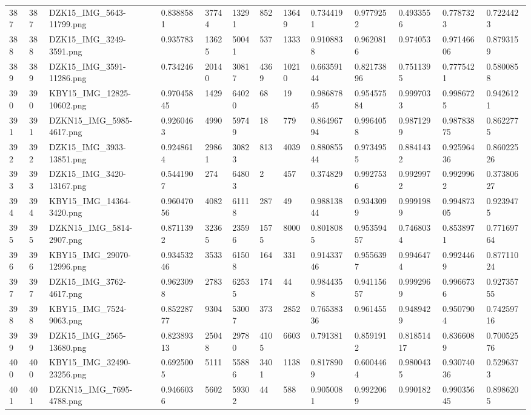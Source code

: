 \documentclass[11pt, a4paper, twoside]{report}
\begin{document}
\begin{longtable}[c]{@{}lllllllllllll@{}}
387 & 387 & DZK15\_IMG\_5643-11799.png & 0.8388581 & 37744 & 13291 & 852 & 13649 & 0.7344191 & 0.9779252 & 0.4933556 & 0.7787323 & 0.7224423 \\
388 & 388 & DZK15\_IMG\_3249-3591.png & 0.935783 & 13625 & 50041 & 537 & 1333 & 0.9108838 & 0.9620816 & 0.974053 & 0.97146606 & 0.8793159 \\
389 & 389 & DZK15\_IMG\_3591-11286.png & 0.734246 & 20140 & 30817 & 4369 & 10210 & 0.66359144 & 0.82173896 & 0.7511395 & 0.7775421 & 0.5800858 \\
390 & 390 & KBY15\_IMG\_12825-10602.png & 0.97045845 & 1429 & 64020 & 68 & 19 & 0.98687845 & 0.95457584 & 0.9997033 & 0.9986725 & 0.9426121 \\
391 & 391 & DZKN15\_IMG\_5985-4617.png & 0.9260463 & 4990 & 59749 & 18 & 779 & 0.86496794 & 0.9964058 & 0.9871299 & 0.98783875 & 0.8622775 \\
392 & 392 & DZK15\_IMG\_3933-13851.png & 0.9248614 & 29861 & 30823 & 813 & 4039 & 0.88085544 & 0.9734955 & 0.8841432 & 0.92596436 & 0.86022526 \\
393 & 393 & DZK15\_IMG\_3420-13167.png & 0.5441907 & 274 & 64803 & 2 & 457 & 0.374829 & 0.9927536 & 0.9929972 & 0.9929962 & 0.37380627 \\
394 & 394 & KBY15\_IMG\_14364-3420.png & 0.96047056 & 4082 & 61118 & 287 & 49 & 0.98813844 & 0.9343099 & 0.9991989 & 0.99487305 & 0.9239475 \\
395 & 395 & DZKN15\_IMG\_5814-2907.png & 0.8711392 & 32365 & 23596 & 1575 & 8000 & 0.8018085 & 0.95359457 & 0.7468034 & 0.8538971 & 0.77169764 \\
396 & 396 & KBY15\_IMG\_29070-12996.png & 0.93453246 & 3533 & 61508 & 164 & 331 & 0.91433746 & 0.9556397 & 0.9946474 & 0.9924469 & 0.87711024 \\
397 & 397 & DZK15\_IMG\_3762-4617.png & 0.9623098 & 2783 & 62535 & 174 & 44 & 0.9844358 & 0.94115657 & 0.9992969 & 0.9966736 & 0.92735755 \\
398 & 398 & KBY15\_IMG\_7524-9063.png & 0.85228777 & 9304 & 53007 & 373 & 2852 & 0.76538336 & 0.961455 & 0.9489429 & 0.9507904 & 0.74259716 \\
399 & 399 & DZK15\_IMG\_2565-13680.png & 0.82389313 & 25048 & 29780 & 4105 & 6603 & 0.791381 & 0.8591912 & 0.81851417 & 0.8366089 & 0.70052576 \\
400 & 400 & KBY15\_IMG\_32490-23256.png & 0.6925005 & 5111 & 55886 & 3401 & 1138 & 0.8178909 & 0.6004464 & 0.9800435 & 0.93074036 & 0.5296373 \\
401 & 401 & DZKN15\_IMG\_7695-4788.png & 0.9466036 & 5602 & 59302 & 44 & 588 & 0.9050081 & 0.9922069 & 0.990182 & 0.99035645 & 0.8986205 \\

\end{longtable}
\end{document}
